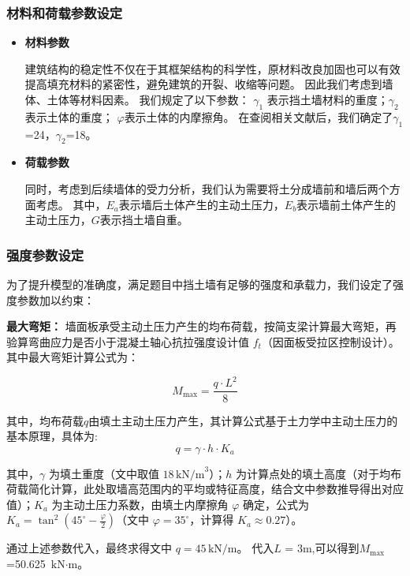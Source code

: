 \documentclass[withoutpreface,bwprint]{cumcmthesis}
\begin{document}
\subsubsection{材料和荷载参数设定}
\begin{itemize}
    \item \textbf{材料参数}
\par
    建筑结构的稳定性不仅在于其框架结构的科学性，原材料改良加固也可以有效提高填充材料的紧密性，避免建筑的开裂、收缩等问题。
    因此我们考虑到墙体、土体等材料因素。
    我们规定了以下参数：
    $\gamma_1$ 表示挡土墙材料的重度；$\gamma_2$ 表示土体的重度；
    $\varphi$表示土体的内摩擦角。
    在查阅相关文献后，我们确定了$\gamma_1$=24，$\gamma_2$=18。
    \item \textbf{荷载参数}
\par
    同时，考虑到后续墙体的受力分析，我们认为需要将土分成墙前和墙后两个方面考虑。
    其中，$E_a$表示墙后土体产生的主动土压力，$E_b$表示墙前土体产生的主动土压力，$G$表示挡土墙自重。
\end{itemize}

\subsubsection{强度参数设定}
为了提升模型的准确度，满足题目中挡土墙有足够的强度和承载力，我们设定了强度参数加以约束：

\textbf{最大弯矩：}
墙面板承受主动土压力产生的均布荷载，按简支梁计算最大弯矩，再验算弯曲应力是否小于混凝土轴心抗拉强度设计值 $f_t $（因面板受拉区控制设计）。
其中最大弯矩计算公式为：

    \begin{equation}
        M_{\text{max}} = \frac{q \cdot L^2}{8}
    \end{equation}
    \par
其中，均布荷载$q$由填土主动土压力产生，其计算公式基于土力学中主动土压力的基本原理，具体为:
    \begin{equation}
        q = \gamma \cdot h \cdot K_a
    \end{equation}
    \par
其中，$\gamma$ 为填土重度（文中取值 $18 \, \text{kN/m}^3$）；$h$ 为计算点处的填土高度（对于均布荷载简化计算，此处取墙高范围内的平均或特征高度，结合文中参数推导得出对应值）；$K_a$ 为主动土压力系数，由填土内摩擦角 $\varphi$ 确定，公式为 $K_a = \tan^2\left(45^\circ - \frac{\varphi}{2}\right)$（文中 $\varphi = 35^\circ$，计算得 $K_a \approx 0.27$）。\par
通过上述参数代入，最终求得文中 $q = 45 \, \text{kN/m}$。
代入$L$ = 3m,可以得到$M_{\text{max}}$=50.625 $\, \text{kN·m}$。
\end{document}
